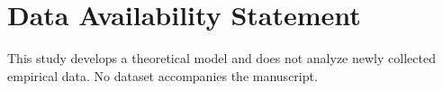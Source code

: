\documentclass[12pt]{article}
\theoremstyle{plain}
\theoremstyle{remark}
\begin{document}
\vspace{1.0em}












\section*{Data Availability Statement}
This study develops a theoretical model and does not analyze newly collected empirical data. No dataset accompanies the manuscript.



\appendix




\end{document}
